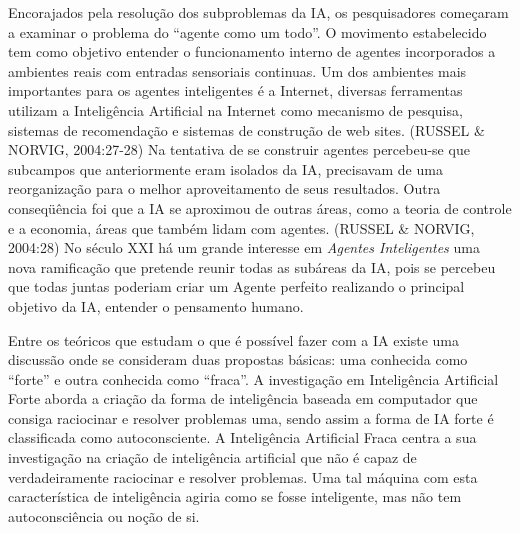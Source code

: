 Encorajados pela resolução dos subproblemas da IA, os pesquisadores começaram a examinar o problema do ``agente como um todo''. O movimento estabelecido tem como objetivo entender o funcionamento interno de agentes incorporados a ambientes reais com entradas sensoriais continuas. Um dos ambientes mais importantes para os agentes inteligentes é a Internet, diversas ferramentas utilizam a Inteligência Artificial na Internet como mecanismo de pesquisa, sistemas de recomendação e sistemas de construção de web sites. (RUSSEL \& NORVIG, 2004:27-28)
Na tentativa de se construir agentes percebeu-se que subcampos que anteriormente eram isolados da IA, precisavam de uma reorganização para o melhor aproveitamento de seus resultados.
Outra conseqüência foi que a IA se aproximou de outras áreas, como a teoria de controle e a economia, áreas que também lidam com agentes. (RUSSEL \& NORVIG, 2004:28)
No século XXI há um grande interesse em \textit{Agentes Inteligentes} uma nova ramificação que pretende reunir todas as subáreas da IA, pois se percebeu que todas juntas poderiam criar um Agente perfeito realizando o principal objetivo da IA, entender o pensamento humano.

Entre os teóricos que estudam o que é possível fazer com a IA existe uma discussão onde se consideram duas propostas básicas: uma conhecida como ``forte'' e outra conhecida como ``fraca''.
A investigação em Inteligência Artificial Forte aborda a criação da forma de inteligência baseada em computador que consiga raciocinar e resolver problemas uma, sendo assim a forma de IA forte é classificada como autoconsciente.
A Inteligência Artificial Fraca centra a sua investigação na criação de inteligência artificial que não é capaz de verdadeiramente raciocinar e resolver problemas. Uma tal máquina com esta característica de inteligência agiria como se fosse inteligente, mas não tem autoconsciência ou noção de si.



